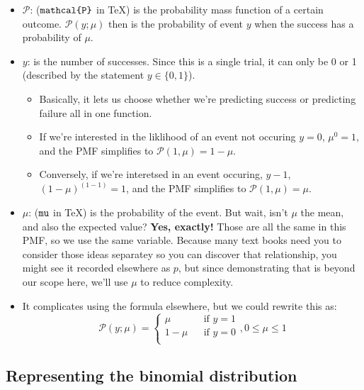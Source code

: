 \documentclass[
]{book}
\providecommand{\tightlist}{%
  \setlength{\itemsep}{0pt}\setlength{\parskip}{0pt}}
\begin{document}
\begin{itemize}
\tightlist
\item
  \(\mathcal{P}\): (\(\texttt{\\mathcal\{P\}}\) in TeX) is the probability mass function of a certain outcome. \(\mathcal{P}(y;\mu)\) then is the probability of event \(y\) when the success has a probability of \(\mu\).
\item
  \(y\): is the number of successes. Since this is a single trial, it can only be 0 or 1 (described by the statement \(y\in\{0, 1\}\)).

  \begin{itemize}
  \tightlist
  \item
    Basically, it lets us choose whether we're predicting success or predicting failure all in one function.
  \item
    If we're interested in the liklihood of an event not occuring \(y=0\), \(\mu^0=1\), and the PMF simplifies to \(\mathcal{P(1,\mu)}=1-\mu\).
  \item
    Conversely, if we're interetsed in an event occuring, \(y-1\), \((1-\mu)^{(1-1)}=1\), and the PMF simplifies to \(\mathcal{P(1,\mu)}=\mu\).
  \end{itemize}
\item
  \(\mu\): (\(\texttt{\\mu}\) in TeX) is the probability of the event. But wait, isn't \(\mu\) the mean, and also the expected value? \textbf{Yes, exactly!} Those are all the same in this PMF, so we use the same variable. Because many text books need you to consider those ideas separatey so you can discover that relationship, you might see it recorded elsewhere as \(p\), but since demonstrating that is beyond our scope here, we'll use \(\mu\) to reduce complexity.
\item
  It complicates using the formula elsewhere, but we could rewrite this as:
  \[
  \mathcal{P}(y;\mu)=
  \begin{cases}
  \mu&&\textrm{if }y=1\\
  1-\mu&&\textrm{if }y=0\\
  \end{cases}, 0\leq\mu\leq1
  \]
\end{itemize}

\hypertarget{representing-the-binomial-distribution}{%
\subsection{Representing the binomial distribution}\label{representing-the-binomial-distribution}}
\end{document}
